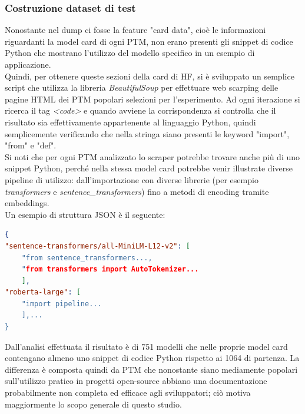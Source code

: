 \documentclass{article}
\begin{document}
\subsubsection{Costruzione dataset di test}
Nonostante nel dump \cite{ait_hfcommunity_2023}  ci fosse la feature "card data", cioè le informazioni riguardanti la model card di ogni PTM, non erano presenti gli snippet di codice Python che mostrano l'utilizzo del modello specifico in un esempio di applicazione.\\  
Quindi, per ottenere queste sezioni della card di HF, si è sviluppato un semplice script che utilizza la libreria \textit{BeautifulSoup}\cite{Richardson_Beautiful_Soup} per effettuare web scarping delle pagine HTML dei PTM popolari selezioni per l'esperimento. Ad ogni iterazione si ricerca il tag \textit{\textless code\textgreater} e quando avviene la corrispondenza si controlla che il risultato sia effettivamente appartenente al linguaggio Python, quindi semplicemente verificando che nella stringa siano presenti le keyword "import", "from" e "def".\\
Si noti che per ogni PTM analizzato lo scraper potrebbe trovare anche più di uno snippet Python, perché nella stessa model card potrebbe venir illustrate diverse pipeline di utilizzo: dall'importazione con diverse librerie (per esempio \textit{transformers} e \textit{sentence\_transformers}) fino a metodi di encoding tramite embeddings.\\
Un esempio di struttura JSON è il seguente:\\
\begin{lstlisting}[language=json, caption={Esempio di struttura per le card ufficiali di HF}, label={lst:json-snippet}]
{
"sentence-transformers/all-MiniLM-L12-v2": [ 
    "from sentence_transformers..., 
    "from transformers import AutoTokenizer...
    ],
"roberta-large": [
    "import pipeline...
    ],...
}
\end{lstlisting}
Dall'analisi effettuata il risultato è di 751 modelli che nelle proprie model card contengano almeno uno snippet di codice Python rispetto ai 1064 di partenza. La differenza è composta quindi da PTM che nonostante siano mediamente popolari sull'utilizzo pratico in progetti open-source abbiano una documentazione probabilmente non completa ed efficace agli sviluppatori; ciò motiva maggiormente lo scopo generale di questo studio.
\end{document}
